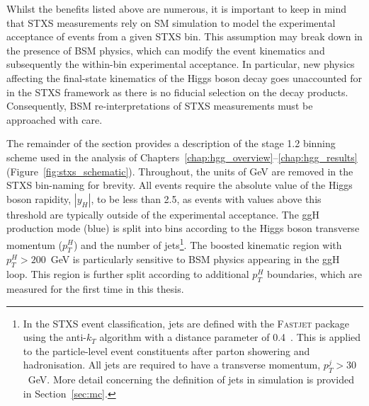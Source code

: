 Whilst the benefits listed above are numerous, it is important to keep in mind that STXS measurements rely on SM simulation to model the experimental acceptance of events from a given STXS bin. This assumption may break down in the presence of BSM physics, which can modify the event kinematics and subsequently the within-bin experimental acceptance. In particular, new physics affecting the final-state kinematics of the Higgs boson decay goes unaccounted for in the STXS framework as there is no fiducial selection on the decay products. Consequently, BSM re-interpretations of STXS measurements must be approached with care.

The remainder of the section provides a description of the stage 1.2 binning scheme used in the \Hgg analysis of Chapters~\ref{chap:hgg_overview}--\ref{chap:hgg_results} (Figure~\ref{fig:stxs_schematic}). Throughout, the units of GeV are removed in the STXS bin-naming for brevity. All events require the absolute value of the Higgs boson rapidity, $|y_H|$, to be less than 2.5, as events with values above this threshold are typically outside of the experimental acceptance. The ggH production mode (blue) is split into bins according to the Higgs boson transverse momentum ($p_T^H$) and the number of jets\footnote{In the STXS event classification, jets are defined with the \textsc{Fastjet} package~\cite{Cacciari:2011ma} using the anti-$k_T$ algorithm with a distance parameter of 0.4~\cite{Cacciari:2008gp}. This is applied to the particle-level event constituents after parton showering and hadronisation. All jets are required to have a transverse momentum, $p_T^j>30$~GeV. More detail concerning the definition of jets in simulation is provided in Section~\ref{sec:mc}.}. The boosted kinematic region with ${p_T^H>200}$~GeV is particularly sensitive to BSM physics appearing in the ggH loop. This region is further split according to additional $p_T^H$ boundaries, which are measured for the first time in this thesis. 

